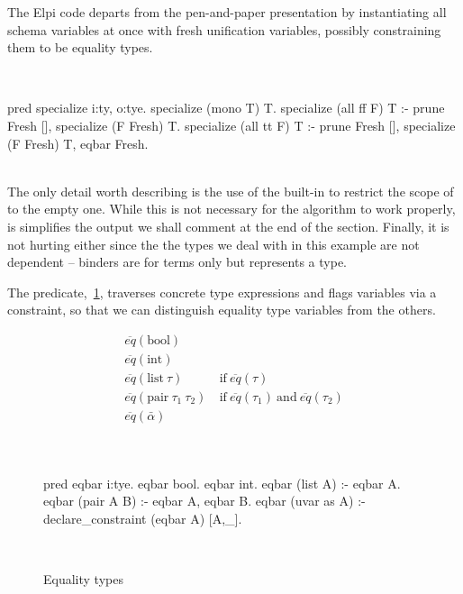\documentclass[a4paper, 11pt]{book}
\newenvironment{elpicode}
  {\VerbatimEnvironment~\\\begin{elpibox}\begin{xelpicode}}{\end{xelpicode}
\end{elpibox}\\}
\begin{document}
The Elpi code departs from the pen-and-paper presentation by instantiating all
schema variables at once with fresh unification variables, possibly
constraining them to be equality types.

\begin{elpicode}
pred specialize i:ty, o:tye.
specialize (mono T) T.
specialize (all ff F) T :-
  prune Fresh [], specialize (F Fresh) T.
specialize (all tt F) T :-
  prune Fresh [], specialize (F Fresh) T, eqbar Fresh.
\end{elpicode}
\noindent
The only detail worth describing is the use of the  built-in
to restrict the scope of  to the empty one. While this is not
necessary for the algorithm to work properly, is simplifies the output
we shall comment at the end of the section. Finally, it is not hurting either
since the the types we deal with in this example are not dependent -- binders
are for terms only but  represents a type.

The  predicate,~\cref{fig:eqbar}, traverses concrete type expressions and
flags variables via a constraint, so that we can distinguish
equality type variables from the others.

\begin{figure}[!h]
\begin{minipage}{0.5\textwidth}
$$
\begin{array}{ll}
  \overline{eq}(\mbox{bool}) & \\
  \overline{eq}(\mbox{int}) & \\
  \overline{eq}(\mbox{list}~\tau) & ~\mbox{if}~ \overline{eq}(\tau) \\
  \overline{eq}(\mbox{pair}~\tau_1~\tau_2) & ~\mbox{if}~ \overline{eq}(\tau_1) ~\mbox{and}~ \overline{eq}(\tau_2)\\
  \overline{eq}(\bar\alpha) & \\
\end{array}
$$
\end{minipage}
\begin{minipage}{0.45\textwidth}
\begin{elpicode}
pred eqbar i:tye.
eqbar bool.
eqbar int.
eqbar (list A) :- eqbar A.
eqbar (pair A B) :- eqbar A, eqbar B.
eqbar (uvar as A) :-
  declare_constraint (eqbar A) [A,_].
\end{elpicode}
\end{minipage}
\caption{Equality types\label{fig:eqbar}}
\end{figure}
\end{document}
